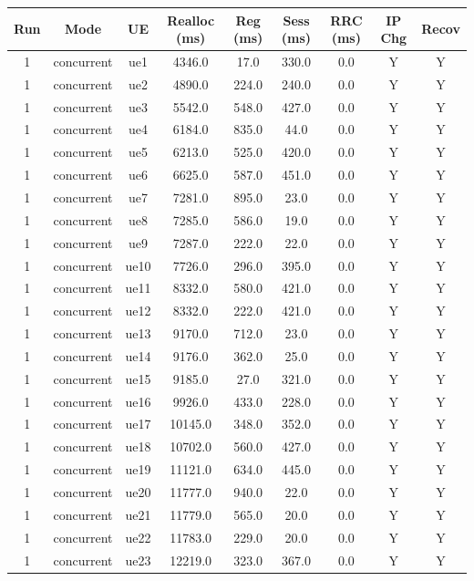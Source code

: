 \begin{table}[ht]
\centering
\begin{tabular}{|c|c|c|c|c|c|c|c|c|}
\hline
Run & Mode & UE & Realloc (ms) & Reg (ms) & Sess (ms) & RRC (ms) & IP Chg & Recov \\
\hline
1 & concurrent & ue1 & 4346.0 & 17.0 & 330.0 & 0.0 & Y & Y \\
1 & concurrent & ue2 & 4890.0 & 224.0 & 240.0 & 0.0 & Y & Y \\
1 & concurrent & ue3 & 5542.0 & 548.0 & 427.0 & 0.0 & Y & Y \\
1 & concurrent & ue4 & 6184.0 & 835.0 & 44.0 & 0.0 & Y & Y \\
1 & concurrent & ue5 & 6213.0 & 525.0 & 420.0 & 0.0 & Y & Y \\
1 & concurrent & ue6 & 6625.0 & 587.0 & 451.0 & 0.0 & Y & Y \\
1 & concurrent & ue7 & 7281.0 & 895.0 & 23.0 & 0.0 & Y & Y \\
1 & concurrent & ue8 & 7285.0 & 586.0 & 19.0 & 0.0 & Y & Y \\
1 & concurrent & ue9 & 7287.0 & 222.0 & 22.0 & 0.0 & Y & Y \\
1 & concurrent & ue10 & 7726.0 & 296.0 & 395.0 & 0.0 & Y & Y \\
1 & concurrent & ue11 & 8332.0 & 580.0 & 421.0 & 0.0 & Y & Y \\
1 & concurrent & ue12 & 8332.0 & 222.0 & 421.0 & 0.0 & Y & Y \\
1 & concurrent & ue13 & 9170.0 & 712.0 & 23.0 & 0.0 & Y & Y \\
1 & concurrent & ue14 & 9176.0 & 362.0 & 25.0 & 0.0 & Y & Y \\
1 & concurrent & ue15 & 9185.0 & 27.0 & 321.0 & 0.0 & Y & Y \\
1 & concurrent & ue16 & 9926.0 & 433.0 & 228.0 & 0.0 & Y & Y \\
1 & concurrent & ue17 & 10145.0 & 348.0 & 352.0 & 0.0 & Y & Y \\
1 & concurrent & ue18 & 10702.0 & 560.0 & 427.0 & 0.0 & Y & Y \\
1 & concurrent & ue19 & 11121.0 & 634.0 & 445.0 & 0.0 & Y & Y \\
1 & concurrent & ue20 & 11777.0 & 940.0 & 22.0 & 0.0 & Y & Y \\
1 & concurrent & ue21 & 11779.0 & 565.0 & 20.0 & 0.0 & Y & Y \\
1 & concurrent & ue22 & 11783.0 & 229.0 & 20.0 & 0.0 & Y & Y \\
1 & concurrent & ue23 & 12219.0 & 323.0 & 367.0 & 0.0 & Y & Y \\

\end{tabular}
\end{table}
